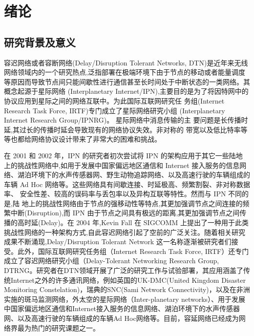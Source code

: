 \chapter{绪论}


\section{研究背景及意义}
容迟网络或者容断网络(Delay/Disruption Tolerant Networks, DTN)是近年来无线网络领域内的一个研究热点,泛指部署在极端环境下由于节点的移动或者能量调度等原因而导致节点间只能间歇性进行通信甚至长时间处于中断状态的一类网络。其概念起源于星际网络 (Interplanetary Internet/IPN),主要目的是为了将因特网中的协议应用到星际之间的网络互联中。为此国际互联网研究任 务组(Internet Research Task Force, IRTF)专门成立了星际网络研究小组 (Interplanetary Internet Research Group/IPNRG)。 星际网络中消息传输的主 要问题是长传播时延,其过长的传播时延会导致现有的网络协议失效。非对称的 带宽以及低比特率等等也都给网络协议设计带来了非常大的困难和挑战。

    在 2001 和 2002 年，IPN 的研究者初次尝试将 IPN 的架构应用于其它一些陆地 上的挑战性网络中,如用于发展中国家偏远地区通信和 Internet 接入服务的信息网 络、湖泊环境下的水声传感器网、野生动物追踪网络、以及高速行驶的车辆组成的 车辆 Ad Hoc 网络等。这些网络具有间歇连接、时延极高、频繁割裂、非对称数据率、 安全性差、较高的误码率与丢包率以及异构互联等特性。然而与 IPN 不同的是,陆 地上的挑战性网络由于节点的强移动性等特点,其更加强调节点之间连接的频繁中断(Disruption),而 IPN 由于节点之间具有极远的距离,其更加强调节点之间传播的高时延(Delay)。在 2004 年,Kevin Fall 在 SIGCOMM 上提出了一种用于此类挑战性网络的一种架构方式,自此容迟网络引起了空前的广泛关注。随着相关研究成果不断涌现,Delay/Disruption Tolerant Network 这一名称逐渐被研究者们接受。此外，国际互联网研究任务组（Internet Research Task Force, IRTF）还专门成立了容迟网络研究小组（Delay-Tolerant Networking Research Group, DTRNG。研究者在DTN领域开展了广泛的研究工作与试验部署，其应用涵盖了传统Internet之外的许多通讯网络，例如英国的UK-DMC(United Kingdom Disaster Monitoring Constelation)，瑞典的SNC(Sami Network Connectivity)，以及在非洲实施的斑马监测网络，外太空的星际网络（Inter-planetary networks）、用于发展中国家偏远地区通信和Internet接入服务的信息网络、湖泊环境下的水声传感器网、以及高速行驶的车辆组成的车辆Ad Hoc网络等。目前，容延网络已经成为网络界最为热门的研究课题之一。

